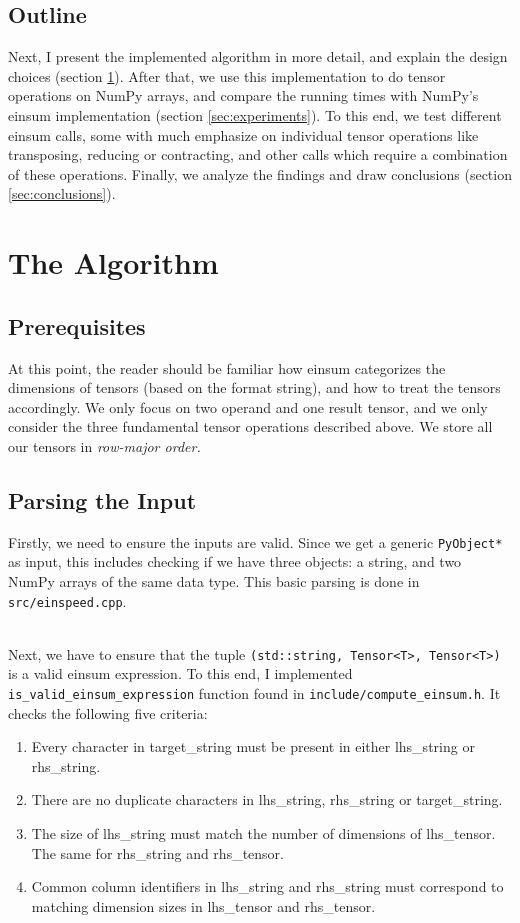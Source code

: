 \documentclass[sigconf]{acmart}
\begin{document}
\subsection{Outline}
Next, I present the implemented algorithm in more detail, and explain the design choices (section \ref{sec:algorithm}). After that, we use this implementation to do tensor operations on NumPy arrays, and compare the running times with NumPy's einsum implementation (section \ref{sec:experiments}). To this end, we test different einsum calls, some with much emphasize on individual tensor operations like transposing, reducing or contracting, and other calls which require a combination of these operations.
Finally, we analyze the findings and draw conclusions (section \ref{sec:conclusions}).



\section{The Algorithm}
\label{sec:algorithm}

\subsection{Prerequisites}
At this point, the reader should be familiar how einsum categorizes the dimensions of tensors (based on the format string), and how to treat the tensors accordingly. We only focus on two operand and one result tensor, and we only consider the three fundamental tensor operations described above. We store all our tensors in \em row-major order\em .


\subsection{Parsing the Input}
Firstly, we need to ensure the inputs are valid. Since we get a generic \texttt{PyObject*} as input, this includes checking if we have three objects: a string, and two NumPy arrays of the same data type. This basic parsing is done in \texttt{src/einspeed.cpp}.

~\\
Next, we have to ensure that the tuple \texttt{(std::string, Tensor<T>, Tensor<T>)} is a valid einsum expression. To this end, I implemented \texttt{is\_valid\_einsum\_expression} function found in \texttt{include/compute\_einsum.h}. It checks the following five criteria:

\begin{enumerate}
  \item Every character in target\_string must be present in either lhs\_string or rhs\_string.
  \item There are no duplicate characters in lhs\_string, rhs\_string or target\_string.
  \item The size of lhs\_string must match the number of dimensions of lhs\_tensor. The same for rhs\_string and rhs\_tensor.
  \item Common column identifiers in lhs\_string and rhs\_string must correspond to matching dimension sizes in lhs\_tensor and rhs\_tensor.
\end{enumerate}
\end{document}

